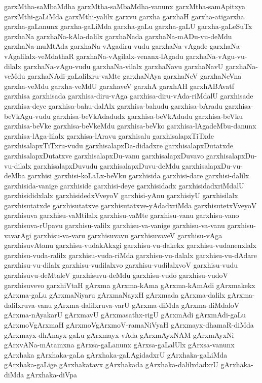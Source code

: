 {garxMtha-saMbaMdha
garxMtha-saMbaMdha-vanunx
garxMtha-samApitxya
garxMthi-gaLiMda
garxMthi-yalilx
garxvu
garxha
garxhaH
garxha-atigarxha
garxha-gaLanunx
garxha-gaLiMda
garxha-gaLu
garxha-gaLU
garxha-gaLeSuTx
garxhaNa
garxhaNa-kAla-dalilx
garxhaNada
garxhaNa-mADu-vu-deMdu
garxhaNa-muMtAda
garxhaNa-vAgadiru-vudu
garxhaNa-vAgade
garxhaNa-vAgalilalx-veMdathaR
garxhaNa-vAgilalx-venanx-lAgadu
garxhaNa-vAgu-vu-dilalx
garxhaNa-vAgu-vudu
garxhaNa-vilalx
garxhaNavu
garxhaNavU
garxhaNa-veMdu
garxhaNAdi-gaLalilxru-vaMte
garxhaNAya
garxhaNeV
garxhaNeVna
garxha-veMdu
garxha-veMdU
garxhaveV
garxhA
garxhAH
garxhABAvatf
garxhisa
garxhisada
garxhisa-diru-vAga
garxhisa-diru-vAda-riMdalU
garxhisade
garxhisa-deye
garxhisa-bahu-dalAlx
garxhisa-bahudu
garxhisa-bAradu
garxhisa-beVkAgu-vudu
garxhisa-beVkAdadudx
garxhisa-beVkAdudu
garxhisa-beVku
garxhisa-beVke
garxhisa-beVkeMdu
garxhisa-beVko
garxhisa-lAgadeMbu-danunx
garxhisa-lAga-lilalx
garxhisa-lAravu
garxhisalu
garxhisalapxTiTxde
garxhisalapxTiTxru-vudu
garxhisalapxDa-didadxre
garxhisalapxDutatxde
garxhisalapxDutatxve
garxhisalapxDu-vanu
garxhisalapxDuvavo
garxhisalapxDu-vu-dilalx
garxhisalapxDuvudu
garxhisalapxDuvu-deMdu
garxhisalapxDu-vu-deMba
garxhisi
garxhisi-koLaLx-beVku
garxhisida
garxhisi-dare
garxhisi-dalilx
garxhisida-vanige
garxhiside
garxhisi-deye
garxhisidadx
garxhisidadxriMdalU
garxhisididxlalx
garxhisidedxVveyoV
garxhisi-yAnu
garxhisiyU
garxhisilalx
garxhisutatxde
garxhisutatxve
garxhisutatxve-yAdadxriMda
garxhisutetxVveyoV
garxhisuva
garxhisu-vaMtilalx
garxhisu-vaMte
garxhisu-vanu
garxhisu-vano
garxhisuva-rUpavu
garxhisu-valilx
garxhisu-va-vanige
garxhisu-va-vanu
garxhisu-vavarAgi
garxhisu-va-varu
garxhisuvavu
garxhisuvaveV
garxhisu-vAga
garxhisuvAtanu
garxhisu-vudakAkxgi
garxhisu-vu-dakekx
garxhisu-vudanenxlalx
garxhisu-vuda-ralilx
garxhisu-vuda-riMda
garxhisu-vu-dalalx
garxhisu-vu-dAdare
garxhisu-vu-dilalx
garxhisu-vudilalxvo
garxhisu-vudilalxvoV
garxhisu-vudu
garxhisuvu-deMtaleV
garxhisuvu-deMdu
garxhisu-vudo
garxhisu-vudoV
garxhisuvevo
garxhiVtaH
gArxma
gArxma-kAma
gArxma-kAmAdi
gArxmakekx
gArxma-gaLu
gArxmaNiyaru
gArxmaNayxH
gArxmada
gArxma-dalilx
gArxma-dalilxruva-vanu
gArxma-dalilxruva-varU
gArxma-diMda
gArxma-diMdaloV
gArxma-nAyakarU
gArxmavU
gArxmasathx-rigU
gArxmAdi
gArxmAdi-gaLu
gArxmoVgArxmaH
gArxmoVgArxmoV-ramaNiVyaH
gArxmayx-dhamaR-diMda
gArxmayx-dhAnayx-gaLu
gArxmayx-vAda
gArxmAyxNAM
gArxmAyxNi
gArxvANa-mAtamxna
gArxsa-gaLanunx
gArxsa-gaLalUlx
gArxsa-vanunx
gArxhaka
gArxhaka-gaLa
gArxhaka-gaLAgidadxrU
gArxhaka-gaLiMda
gArxhaka-gaLige
gArxhakatavx
gArxhakada
gArxhaka-dalilxdadxrU
gArxhaka-diMda
gArxhaka-diVpa
}
